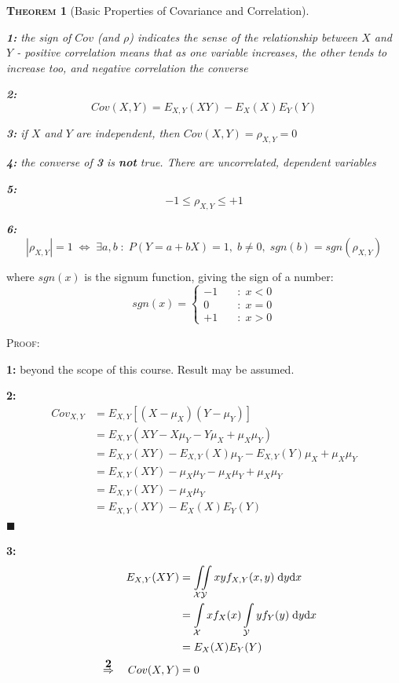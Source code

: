 \documentclass[12pt,a4paper]{article}
\newtheorem{theorem}{\textsc{Theorem}}[section]
\newcommand{\diff}{\mathrm{d}}
\newcommand{\imply}{\quad\Rightarrow\quad}
\begin{document}
\begin{theorem}[Basic Properties of Covariance and Correlation]$\;$\par\vspace{1cm}

\noindent\textbf{1: } the sign of $Cov$ (and $\rho$) indicates the sense of the relationship between $X$ and $Y$ - positive correlation means that as one variable increases, the other tends to increase too, and negative correlation the converse

\noindent\textbf{2: } $$Cov(X,Y) = E_{X,Y}(XY) - E_{X}(X)E_{Y}(Y)$$

\noindent\textbf{3: } if $X$ and $Y$ are independent, then $Cov(X,Y) = \rho_{X,Y} = 0$

\noindent\textbf{4: } the converse of \textbf{3} is \textbf{not} true. There are uncorrelated, dependent variables

\noindent\textbf{5: } $$-1 \leq \rho_{X,Y} \leq +1$$

\noindent\textbf{6: } $$|\rho_{X,Y}| = 1 \; \Leftrightarrow\; \exists a,b \; : \; P(Y=a+bX) = 1,\; b\neq 0,\; sgn(b) = sgn(\rho_{X,Y})$$
\end{theorem}
where $sgn(x)$ is the signum function, giving the sign of a number:
$$sgn(x) = \left\{\begin{array}{cl} -1\quad& : \; x<0\\ 0\quad& : \; x=0\\ +1\quad& :\; x >0\end{array}\right.$$

\noindent\textsc{Proof:}\par\vspace{1cm}

\noindent\textbf{1: } beyond the scope of this course. Result may be assumed.

\noindent\textbf{2: } \begin{align*}
Cov_{X,Y} &= E_{{X,Y}}[(X-\mu_X)(Y-\mu_Y)]\\
&= E_{{X,Y}}(XY - X\mu_Y - Y\mu_X + \mu_X\mu_Y)\\
&= E_{{X,Y}}(XY) - E_{X,Y}(X)\mu_Y - E_{{X,Y}}(Y)\mu_X + \mu_X\mu_Y\\
&= E_{{X,Y}}(XY) - \mu_X\mu_Y - \mu_X\mu_Y + \mu_X\mu_Y\\
&= E_{{X,Y}}(XY) - \mu_X\mu_Y\\
&= E_{{X,Y}}(XY) - E_{X}(X)E_{Y}(Y)
\end{align*}
\hfill$\blacksquare$

\noindent\textbf{3: }
\begin{align*}
E_{X,Y}(XY) &= \iint\limits_{\mathcal{X}\mathcal{Y}} xyf_{X,Y}(x,y)\;\diff y\diff x\\
&= \int\limits_{\mathcal{X}} xf_X(x) \int\limits_{\mathcal{Y}} yf_Y(y) \;\diff y \diff x\\
&= E_X(X)E_Y(Y)\\
\overset{\mbox{\bf 2}}{\imply} Cov(X,Y) &= 0
\end{align*}
\end{document}
